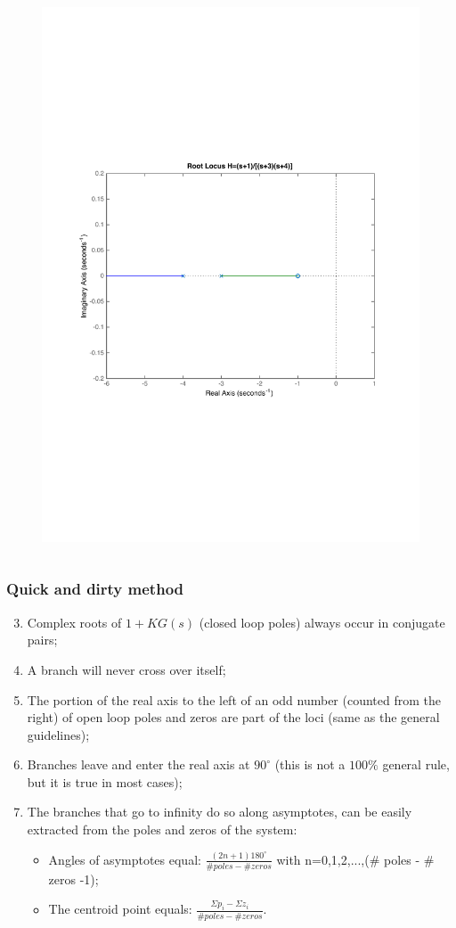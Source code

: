 \begin{frame}
\begin{columns}
\begin{column}{0.5\textwidth}
\begin{figure}
				\includegraphics[width=0.8\linewidth]{how_to_draw_easy_ex2}
			\end{figure}
		\end{column}
	\end{columns}
\end{frame}

\begin{frame}
\frametitle{Quick and dirty method}
	\begin{enumerate}
		\setcounter{enumi}{2}
		\item Complex roots of $1 + KG(s)$ (closed loop poles) always occur in conjugate pairs;
		\item A branch will never cross over itself;
		\item The portion of the real axis to the left of an odd number (counted from the right) of open loop poles and zeros are part of the loci (same as the general guidelines);
		\item Branches leave and enter the real axis at $90^{\circ}$ (this is not a $100\%$ general rule, but it is true in most cases);
		\item The branches that go to infinity do so along asymptotes, can be easily extracted from the poles and zeros of the system: 
		\begin{itemize}
			\item Angles of asymptotes equal:
			$\frac{(2n + 1)180^{\circ}}{\# poles - \# zeros}$ with n=0,1,2,...,($\#$ poles - $\#$ zeros -1);
			\item The centroid point equals: $\frac{\Sigma p_i - \Sigma z_i}{\# poles - \# zeros}$.
		\end{itemize}
	\end{enumerate}
\end{frame}

